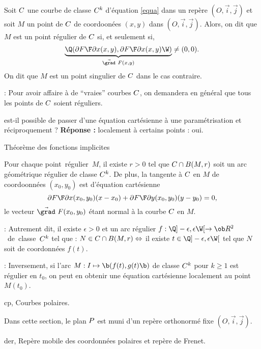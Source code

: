 \Definition Soit $\sc C$ une courbe de classe $\sc C^k$ d'\'equation \eqref{equa} 
dans un rep\`ere $(O,\vec i,\vec j)$ et soit $M$ un point de $\sc C$ 
de coordoon\'ees $(x,y)$ dans $(O,\vec i,\vec j)$. Alors, on dit que $M$ 
est un point r\'egulier de $\sc C$ si, et seulement si, 
$$
\underbrace{\Q({\partial F\F\partial x}(x,y),{\partial F\F\partial x}(x,y)\W)}_{\vec{\grad}\ F(x,y)}\neq(0,0).
$$ 
On dit que $M$ est un point singulier de $\sc C$ dans le cas contraire. 
\bigskip

\Remarque : Pour avoir affaire \`a de ``vraies'' courbes $\sc C$, on demandera en g\'en\'eral 
que tous les points de $\sc C$ soient r\'eguliers. 
\bigskip

est-il possible de passer d'une \'equation cart\'esienne 
\`a une param\'etrisation et r\'eciproquement ? {\bf R\'eponse :}
localement \`a certains points : oui. 
\medskip

\Concept Th\'eor\`eme des fonctions implicites

\Theoreme [$(O,\vec i,\vec j)$ rep\`ere de $\sc P$, $k\in\overline{\ob N}^*$ et 
$\sc C$ courbe de classe $\sc C^k$ d'\'equation cart\'esienne ${F(x,y)=0}$ dans $\sc P$] 
Pour chaque point~r\'egulier~$M$, il existe $r>0$ tel que $\sc C\cap B(M,r)$ 
soit un arc g\'eom\'etrique r\'egulier de classe $\sc C^k$. 
\medskip\noindent
De plus, la tangente \`a $\sc C$ en $M$ de coordoonn\'ees $(x_0,y_0)$ est d'\'equation cart\'esienne 
$$
{\partial F\F\partial x}(x_0,y_0)(x-x_0)+{\partial F\F\partial y}(x_0,y_0)(y-y_0)=0,
$$
le vecteur $\vec{\grad}\ F(x_0,y_0)$ \'etant normal \`a la courbe $\sc C$ en $M$.
\bigskip

\Remarque : Autrement dit, il existe $\epsilon>0$ 
et un arc r\'egulier $f:\Q]-\epsilon,\epsilon\W[\to\ob R^2$~de~classe~$\sc C^k$ 
tel que : $N\in \sc C\cap B(M,r)\Leftrightarrow $ il existe $t\in\Q]-\epsilon,\epsilon\W[$ 
tel que $N$ soit de coordonn\'ees $f(t)$. 
\bigskip

\Remarque : Inversement, si l'arc $M:I\mapsto\b(f(t),g(t)\b)$ de classe $\sc C^k$ pour $k\ge1$ 
est r\'egulier en $t_0$, on peut en obtenir une \'equation cart\'esienne localement 
au point $M(t_0)$. 
\bigskip



\Section cp, Courbes polaires. 
\bigskip

\noindent
Dans cette section, le plan $\sc P$ est muni d'un rep\`ere orthonorm\'e fixe
$(O,\vec i,\vec j)$. 
\bigskip

\Subsection der, Rep\`ere mobile des coordonn\'ees polaires et rep\`ere de Frenet. 
\bigskip

